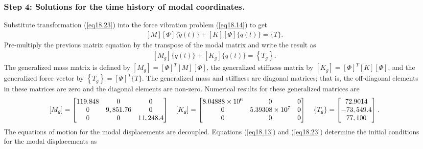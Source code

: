 \documentclass{AeroStructure-ERJohnson}
\begin{document}
\subsubsection{Step 4: Solutions for the time history of modal coordinates.} Substitute transformation (\ref{eq18.23}) into the force vibration problem (\ref{eq18.14}) to get
\begin{align}\label{eq18.24}
[M][\Phi]\{\ddot{q}(t)\}+[K][\Phi]\{q(t)\}=\{T\}.
\end{align}
Pre-multiply the previous matrix equation by the transpose of the modal matrix and write the result as
\begin{align}\label{eq18.25}
\left[M_{g}\right]\{\ddot{q}(t)\}+\left[K_{g}\right]\{q(t)\}=\left\{T_{g}\right\}.
\end{align}
The generalized mass matrix is defined by $\left[M_{g}\right]=[\Phi]^{T}[M][\Phi]$, the generalized stiffness matrix by $\left[K_{g}\right]=[\Phi]^{T}[K][\Phi]$, and the generalized force vector by $\left\{T_{g}\right\}=[\Phi]^{T}\{T\}$. The generalized mass and stiffness  are diagonal matrices; that is, the off-diagonal elements in these matrices are zero and the diagonal elements are non-zero. Numerical results for these generalized matrices are
\begin{align}\label{eq18.26}
\left[M_{g}\right]=\left[\begin{array}{@{}ccc@{}}119.848 & 0 & 0 \\0 & 9,851.76 & 0 \\0 & 0 & 11,248.4\end{array}\right] \quad\left[K_{g}\right]=\left[\begin{array}{@{}ccc@{}}8.04888 \times 10^{6} & 0 & 0 \\0 & 5.39308 \times 10^{7} & 0 \\0 & 0 & 0\end{array}\right] \quad\left\{T_{g}\right\}=\left[\begin{array}{@{}c@{}}72.9014 \\-73,549.4 \\77,100\end{array}\right].
\end{align}
The equations of motion for the modal displacements are decoupled. Equations (\ref{eq18.13}) and (\ref{eq18.23}) determine the initial conditions for the modal displacements as
\end{document}
